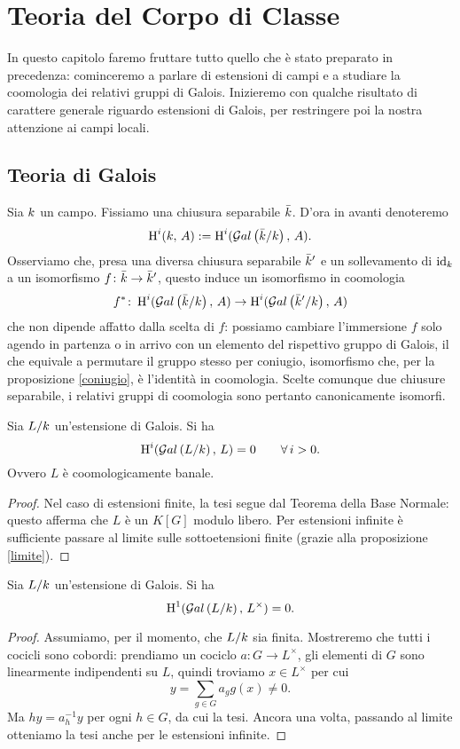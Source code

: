 \chapter{Teoria del Corpo di Classe}
In questo capitolo faremo fruttare tutto quello che è stato preparato in precedenza: cominceremo a parlare di estensioni di campi e a studiare la coomologia dei relativi gruppi di Galois. Inizieremo con qualche risultato di carattere generale riguardo estensioni di Galois, per restringere poi la nostra attenzione ai campi locali.




\section{Teoria di Galois}
Sia $ k $ un campo. Fissiamo una chiusura separabile $ \bar{k} $. D'ora in avanti denoteremo
\[ \operatorname{H}^i(k, \, A) := \operatorname{H}^i(\mathcal{G}al\left( \bar{k} / k \right), \, A). \]
Osserviamo che, presa una diversa chiusura separabile $ \bar{k}' $ e un sollevamento di $ \operatorname{id}_{k} $ a un isomorfismo $ f\colon \bar{k} \to \bar{k}' $, questo induce un isomorfismo in coomologia
\[ f^* \colon \operatorname{H}^i(\mathcal{G}al\left( \bar{k} / k \right), \, A) \to \operatorname{H}^i(\mathcal{G}al\left( \bar{k}' / k \right), \, A) \]
che non dipende affatto dalla scelta di $ f $: possiamo cambiare l'immersione $ f $ solo agendo in partenza o in arrivo con un elemento del rispettivo gruppo di Galois, il che equivale a permutare il gruppo stesso per coniugio, isomorfismo che, per la proposizione \ref{coniugio}, è l'identità in coomologia. Scelte comunque due chiusure separabile, i relativi gruppi di coomologia sono pertanto canonicamente isomorfi.\\

\begin{theorem} \label{Hadd}
	Sia $ L / k $ un'estensione di Galois. Si ha
	\[ \operatorname{H}^i(\mathcal{G}al\left(  L / k \right), \, L) = 0 \qquad \forall \, i > 0. \]
	Ovvero $ L $ è coomologicamente banale.
\end{theorem}
\begin{proof}
	Nel caso di estensioni finite, la tesi segue dal Teorema della Base Normale: questo afferma che $ L $ è un $ K[G] $ modulo libero. Per estensioni infinite è sufficiente passare al limite sulle sottoetensioni finite (grazie alla proposizione \ref{limite}).
\end{proof}

\begin{theorem}[Hilbert 90]\label{H90}
	Sia $ L/k $ un'estensione di Galois. Si ha
	\[ \operatorname{H}^1(\mathcal{G}al\left(  L / k \right), \, L^\times) = 0. \]
\end{theorem}
\begin{proof}
	Assumiamo, per il momento, che $ L/k $ sia finita. Mostreremo che tutti i cocicli sono cobordi: prendiamo un cociclo $ a \colon G \to L^\times $, gli elementi di $ G $ sono linearmente indipendenti su $ L $, quindi troviamo $ x \in L^\times $ per cui
	\[ y = \sum_{g \in G} a_g g(x) \neq 0. \]
	Ma $ hy = a_h^{-1}y $ per ogni $ h \in G $, da cui la tesi.
	Ancora una volta, passando al limite otteniamo la tesi anche per le estensioni infinite. \todo[bruttino]
\end{proof}

